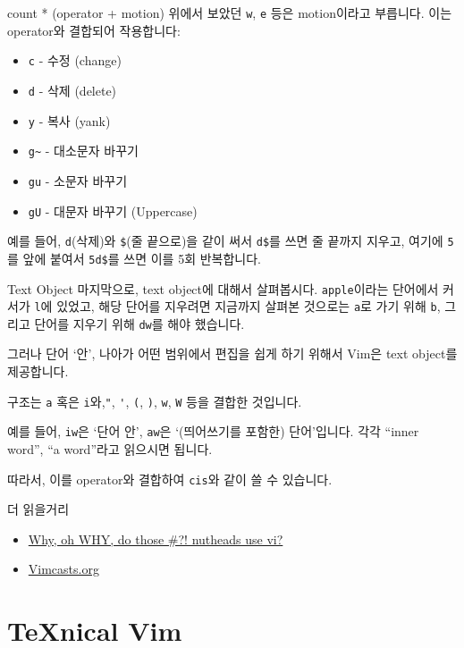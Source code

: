 \documentclass{beamer}
\begin{document}
\begin{frame}[fragile]{count * (operator + motion)}
  위에서 보았던 \verb/w/, \verb/e/ 등은 motion이라고 부릅니다.
  이는 operator와 결합되어 작용합니다:
  \begin{itemize}
    \item \verb/c/ - 수정 (\alert{c}hange)
    \item \verb/d/ - 삭제 (\alert{d}elete)
    \item \verb/y/ - 복사 (\alert{y}ank)
    \item \verb|g~| - 대소문자 바꾸기
    \item \verb/gu/ - 소문자 바꾸기
    \item \verb/gU/ - 대문자 바꾸기 (\alert{U}ppercase)
  \end{itemize}
  예를 들어, \verb/d/(삭제)와 \verb/$/(줄 끝으로)을 같이 써서 \verb/d$/를 쓰면
  줄 끝까지 지우고, 여기에 \verb/5/를 앞에 붙여서 \verb/5d$/를 쓰면 이를 5회
  반복합니다.
\end{frame}

\begin{frame}[fragile]{Text Object}
  마지막으로, \alert{text object}에 대해서 살펴봅시다.
  \verb/apple/이라는 단어에서 커서가 \verb/l/에 있었고, 해당 단어를 지우려면
  지금까지 살펴본 것으로는 \pause\verb/a/로 가기 위해 \verb/b/, 그리고 단어를
  지우기 위해 \verb/dw/를 해야 했습니다.

  그러나 단어 `안', 나아가 어떤 범위에서 편집을 쉽게 하기 위해서 Vim은 text
  object를 제공합니다.

  구조는 \verb/a/ 혹은 \verb/i/와,\pause \verb/"/, \verb/'/, \verb/(/, \verb/)/,
  \verb/w/, \verb/W/ 등을 결합한 것입니다.\pause

  예를 들어, \verb/iw/은 `단어 안', \verb/aw/은 `(띄어쓰기를 포함한)
  단어'입니다.
  각각 ``inner word'', ``a word''라고 읽으시면 됩니다.

  따라서, 이를 operator와 결합하여 \verb/cis/와 같이 쓸 수 있습니다.
\end{frame}

\begin{frame}{더 읽을거리}
  \begin{itemize}
    \item \href{http://www.viemu.com/a-why-vi-vim.html}{Why, oh WHY, do those \#?\@! nutheads use vi?}
    \item \href{http://vimcasts.org/}{Vimcasts.org}
  \end{itemize}
\end{frame}

\section{\TeX{}nical Vim}
\end{document}
